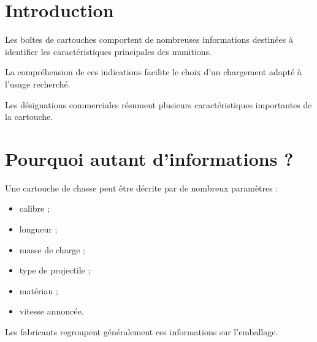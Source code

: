 
\section{Introduction}

Les boîtes de cartouches comportent de nombreuses informations destinées à
identifier les caractéristiques principales des munitions.

La compréhension de ces indications facilite le choix d'un chargement adapté à
l'usage recherché.

\begin{aretenir}

Les désignations commerciales résument plusieurs caractéristiques importantes
de la cartouche.

\end{aretenir}

\section{Pourquoi autant d'informations ?}

Une cartouche de chasse peut être décrite par de nombreux paramètres :

\begin{itemize}
    \item calibre ;
    \item longueur ;
    \item masse de charge ;
    \item type de projectile ;
    \item matériau ;
    \item vitesse annoncée.
\end{itemize}

Les fabricants regroupent généralement ces informations sur l'emballage.

